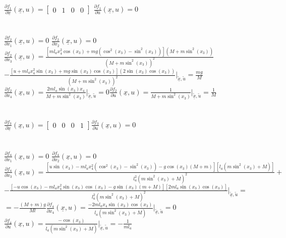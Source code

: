 $\displaystyle\frac{\partial{f_1}}{\partial{\underline{x}}}(\underline x,u)=
\begin{bmatrix}
0&1&0&0
\end{bmatrix}$\qquad
$\displaystyle\frac{\partial{f_1}}{\partial{u}}(\underline{x},u)=0$\\\\\\
$\displaystyle\frac{\partial{f_2}}{\partial{x_1}}(\underline{x},u)=0$\qquad
$\displaystyle\frac{\partial{f_2}}{\partial{x_2}}(\underline{x},u)=0$\\
$\displaystyle\frac{\partial{f_2}}{\partial{x_3}}(\underline{x},u)=\displaystyle\frac{[ml_ax_4^2\cos(x_3)+mg(\cos^2(x_3)-\sin^2(x_3))](M+m\sin^2(x_3))}{(M+m\sin^2(x_3))^2}$\\
$-\displaystyle\frac{[u+ml_ax_4^2\sin(x_3)+mg\sin(x_3)\cos(x_3)](2\sin(x_3)\cos(x_3))}{(M+m\sin^2(x_3))^2}\bigg|_{\underline{\tilde{x}},\tilde{u}}=\displaystyle\frac{mg}{M}$\\ $\displaystyle\frac{\partial{f_2}}{\partial{x_4}}(\underline{x},u)=\displaystyle\frac{2ml_a\sin(x_3)x_4}{M+m\sin^2(x_3)}\bigg|_{\underline{\tilde{x}},\tilde{u}}=0$\quad$\displaystyle\frac{\partial{f_2}}{\partial{u}}(\underline{x},u)=\displaystyle\frac{1}{M+m\sin^2(x_3)}\bigg|_{\underline{\tilde{x}},\tilde{u}}=\displaystyle\frac{1}{M}$\\\\\\
$\displaystyle\frac{\partial{f_3}}{\partial{\underline{x}}}(\underline x,u)=
\begin{bmatrix}
0&0&0&1
\end{bmatrix}$\qquad$\displaystyle\frac{\partial{f_3}}{\partial{u}}(\underline{x},u)=0$\\\\\\
$\displaystyle\frac{\partial{f_4}}{\partial{x_1}}(\underline{x},u)=0$\qquad
$\displaystyle\frac{\partial{f_4}}{\partial{x_2}}(\underline{x},u)=0$\\
$\displaystyle\frac{\partial{f_4}}{\partial{x_3}}(\underline{x},u)=\displaystyle\frac{[u\sin(x_3)-ml_ax_4^2(\cos^2(x_3)-\sin^2(x_3))-g\cos(x_3)(M+m)][l_a(m\sin^2(x_3)+M)]}{l_a^2(m\sin^2(x_3)+M)^2}+$ $-\displaystyle\frac{[-u\cos(x_3)-ml_ax^2_4\sin(x_3)\cos(x_3)-g\sin(x_3)(m+M)][2ml_a\sin(x_3)\cos(x_3)]}{l_a^2(m\sin^2(x_3)+M)^2}\bigg|_{\underline{\tilde{x}},\tilde{u}}=$
$=-\displaystyle\frac{(M+m)g}{Ml}$\qquad$\displaystyle\frac{\partial{f_4}}{\partial{x_4}}(\underline{x},u)=\displaystyle\frac{-2ml_ax_4\sin(x_3)\cos(x_3)}{l_a(m\sin^2(x_3)+M)}\bigg|_{\underline{\tilde{x}},\tilde{u}}=0$\\$\displaystyle\frac{\partial{f_4}}{\partial{u}}(\underline{x},u)=\displaystyle\frac{-\cos(x_3)}{l_a(m\sin^2(x_3)+M)}\bigg|_{\underline{\tilde{x}},\tilde{u}}=-\displaystyle\frac{1}{ml_a}$\\\\\\
